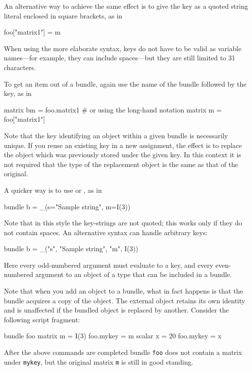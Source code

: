 An alternative way to achieve the same effect is to give the key as a
quoted string literal enclosed in square brackets, as in
\begin{code}
  foo["matrix1"] = m
\end{code}
When using the more elaborate syntax, keys do not have to be valid as
variable names---for example, they can include spaces---but they are
still limited to 31 characters.

To get an item out of a bundle, again use the name of the bundle
followed by the key, as in

\begin{code}
matrix bm = foo.matrix1
# or using the long-hand notation
matrix m = foo["matrix1"]
\end{code}

Note that the key identifying an object within a given bundle is
necessarily unique. If you reuse an existing key in a new assignment,
the effect is to replace the object which was previously stored under
the given key. In this context it is not required that the type of the
replacement object is the same as that of the original.

A quicker way is to use  or \cmd{\_()}, as in
\begin{code}
  bundle b = _(s="Sample string", m=I(3))
\end{code}
Note that in this style the key-strings are not quoted; this works only
if they do not contain spaces. An alternative syntax can handle
arbitrary keys:
\begin{code}
  bundle b = _("s", "Sample string", "m", I(3))
\end{code}
Here every odd-numbered argument must evaluate to a key, and every
even-numbered argument to an object of a type that can be included in
a bundle.

Note that when you add an object to a bundle, what in fact happens is
that the bundle acquires a copy of the object. The external object
retains its own identity and is unaffected if the bundled object is
replaced by another. Consider the following script fragment:

\begin{code}
bundle foo
matrix m = I(3)
foo.mykey = m
scalar x = 20
foo.mykey = x
\end{code}

After the above commands are completed bundle \texttt{foo} does not
contain a matrix under \texttt{mykey}, but the original matrix
\texttt{m} is still in good standing.

